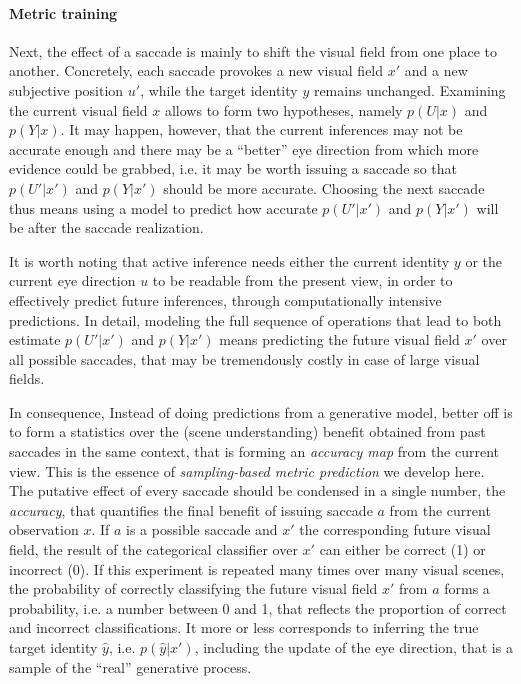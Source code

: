 \paragraph{Metric training}
Next, the effect of a saccade is mainly to shift the visual field from one place to another. Concretely, each saccade provokes a new visual field $x'$ and a new subjective position $u'$, while the target identity $y$ remains unchanged. Examining the current visual field $x$ allows to form two hypotheses, namely $p(U|x)$ and $p(Y|x)$. It may happen, however, that the current inferences may not be accurate enough and there may be a ``better'' eye direction from which more evidence could be grabbed, i.e. it may be worth issuing a saccade so that $p(U'|x')$ and $p(Y|x')$ should be more accurate. Choosing the next saccade thus means using a model to predict how accurate $p(U'|x')$ and $p(Y|x')$ will be after the saccade realization. 


It is worth noting that active inference needs either the current identity $y$ or the current eye direction $u$ to be readable from the present view, in order to effectively predict future inferences, through computationally intensive predictions. In detail, modeling the full sequence of operations that lead to both estimate $p(U'|x')$ and $p(Y|x')$ means predicting the future visual field $x'$ over all possible saccades, that may be tremendously costly in case of large visual fields. 

In consequence, Instead of doing predictions from a generative model, better off is to form a statistics over the (scene understanding) benefit obtained from past saccades in the same context, that is forming an \emph{accuracy map} from the current view. This is the essence of \emph{sampling-based metric prediction} we develop here. The putative effect of every saccade should be condensed in a single number, the \emph{accuracy}, that quantifies the final benefit of issuing saccade $a$ %
from the current observation $x$. If $a$ is a possible saccade and $x'$ the corresponding future visual field, the result of the categorical classifier over $x'$ can either be correct (1) or incorrect (0).
If this experiment is repeated many times over many visual scenes, the probability of correctly classifying the future visual field $x'$ from $a$ forms a probability, i.e. a number between 0 and 1, that reflects the proportion of correct and incorrect classifications.
It more or less corresponds to inferring the true target identity $\hat{y}$, i.e. $p(\hat{y}|x')$, including the update of the eye direction, that is a sample of the ``real'' generative process.

